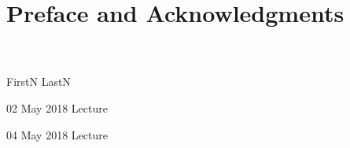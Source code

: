 \documentclass[11pt]{book} %
\begin{document}
	\renewcommand*{\Term}{Term 201x} %
	\renewcommand*{\CourseCode}{MATH 000} %
	\renewcommand*{\CourseName}{Course Name} %
	\renewcommand*{\ProfName}{ProfFName ProfLName} %
	\renewcommand*{\COlink}{https://student.cs.uwaterloo.ca/~cs245}
	\classtitle
	\pagestyle{plain}
	\section*{Preface and Acknowledgments}
	\CKpreface\\~\\
	\rrule
	\hfill FirstN LastN
	\clearpage
	\pagestyle{Lecture}
	\fancyhfoffset[L,O]{0pt} %
	\begin{comment}
	\end{comment}
\begin{lec}{02 May 2018}
	Lecture
\end{lec}
\begin{lec}{04 May 2018}
	Lecture
\end{lec}
\end{document}

